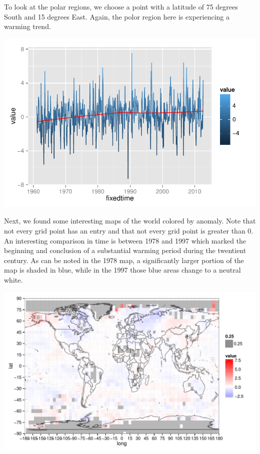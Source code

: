 \documentclass{article}\usepackage{graphicx, color}
\newenvironment{knitrout}{}{} %
\begin{document}

To look at the polar regions, we choose a point with a latitude of 75 degrees South and 15 degrees East. Again, the polor region here is experiencing a warming trend.


\begin{knitrout}
\color{fgcolor}\includegraphics[width=\linewidth]{figure/antartic-trend} 
\end{knitrout}



Next, we found some interesting maps of the world colored by anomaly. Note that not every grid point has an entry and that not every grid point is greater than 0. An interesting comparison in time is between 1978 and 1997 which marked the beginning and conclusion of a substantial warming period during the twentient century. As can be noted in the 1978 map, a significantly larger portion of the map is shaded in blue, while in the 1997 those blue areas change to a neutral white. 


\begin{knitrout}
\color{fgcolor}\includegraphics[width=\linewidth]{figure/1978-map} 
\end{knitrout}
\end{document}
